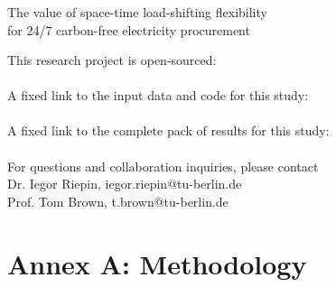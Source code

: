 \begin{frame}\frametitle{\quad}

  {\Large
  \alert{The value of space-time load-shifting flexibility \\ 
  for 24/7 carbon-free electricity procurement}
  }

  {\small
  \vspace{.2cm}
  This research project is open-sourced: \\
  \faGithub~ \\
  A fixed link to the input data and code for this study: \\
  \faLink~ \\
  A fixed link to the complete pack of results for this study: \\
  \faLink~ \\

  \vspace{.2cm}
  For questions and collaboration inquiries, please contact \\
  Dr. Iegor Riepin, iegor.riepin@tu-berlin.de \\
  Prof. Tom Brown, t.brown@tu-berlin.de

  \vspace{.2cm}
  \noindent{}
  }
\end{frame}


\section{Annex A: Methodology}



